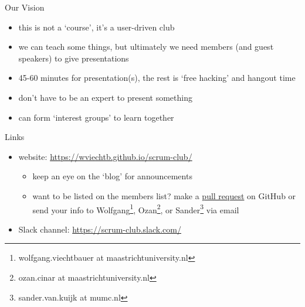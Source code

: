\documentclass[t,12pt]{beamer}
\begin{document}
\begin{frame}{Our Vision}

\begin{itemize}
   \item this is not a `course', it's a user-driven club
   \item we can teach some things, but ultimately we need members (and guest speakers) to give presentations
   \item 45-60 minutes for presentation(s), the rest is `free hacking' and hangout time
   \item don't have to be an expert to present something
   \item can form `interest groups' to learn together
\end{itemize}

\end{frame}


\begin{frame}{Links}

\begin{itemize}
   \item website: {\footnotesize \url{https://wviechtb.github.io/scrum-club/}}
   \begin{itemize}
      \item keep an eye on the `blog' for announcements
      \item want to be listed on the members list? make a \href{https://help.github.com/articles/about-pull-requests/}{pull request} on GitHub or send your info to Wolfgang\footnote{wolfgang.viechtbauer at maastrichtuniversity.nl}, Ozan\footnote{ozan.cinar at maastrichtuniversity.nl}, or Sander\footnote{sander.van.kuijk at mumc.nl} via email
   \end{itemize}
   \item Slack channel: {\footnotesize \url{https://scrum-club.slack.com/}}
\end{itemize}

\end{frame}

\end{document}
